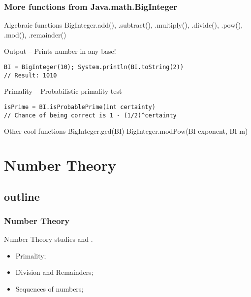 \documentclass{beamer}
\begin{document}
\begin{frame}[fragile]
  \frametitle{More functions from Java.math.BigInteger}
{\smaller

  \begin{block}{Algebraic functions}
    BigInteger.add(), .subtract(), .multiply(), .divide(),
    .pow(), .mod(), .remainder()
  \end{block}

  \begin{block}{Output -- Prints number in any base!}
\begin{verbatim}
BI = BigInteger(10); System.println(BI.toString(2))
// Result: 1010
\end{verbatim}
  \end{block}

  \begin{block}{Primality -- Probabilistic primality test}
\begin{verbatim}
isPrime = BI.isProbablePrime(int certainty)
// Chance of being correct is 1 - (1/2)^certainty
\end{verbatim}
  \end{block}


\begin{block}{Other cool functions}
  BigInteger.gcd(BI)
  BigInteger.modPow(BI exponent, BI m)
\end{block}}
\end{frame}


\section{Number Theory}
\subsection{outline}
\begin{frame}
  \frametitle{Number Theory} {\small

    Number Theory studies  and
    .

    \bigskip

    \begin{itemize}
    \item Primality;
    \item Division and Remainders;
    \item Sequences of numbers;
    \end{itemize}

    }
\end{frame}
\end{document}
